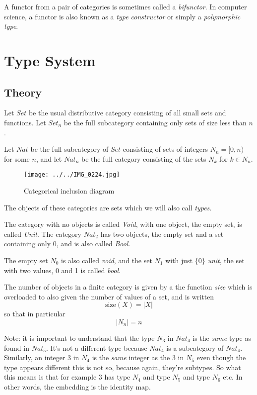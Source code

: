 \documentclass[oneside]{book}
\theoremstyle{plain}
\theoremstyle{definition}
\theoremstyle{plain}
\def\Set{\mathit{Set}}
\def\Nat{\mathit{Nat}}
\begin{document}
A functor from a pair of categories is sometimes called a {\em bifunctor}.
In computer science, a functor is also known as a {\em type constructor}
or simply a {\em polymorphic type}.
\chapter{Type System}
\section{Theory}
Let $\Set$ be the usual distributive category consisting of all small sets and functions.
Let $\Set_n$ be the full subcategory containing only sets of size less than $n$.

Let $\Nat$ be the full subcategory of $\Set$ consisting
of sets of integers $\mathit{N}_n=[0,n)$ for some $n$, and let
$\Nat_n$ be the full category consisting of the 
sets $N_k$ for $k\in \mathit{N}_n$.

\begin{figure}[h]
\texttt{[image: ../../IMG\_0224.jpg]}
\caption{Categorical inclusion diagram}
\label{fig:categorical inclusion}
\end{figure}

The objects of these categories are sets which we will also call {\em types.}

The category with no objects is called {\em Void}, with one object, the empty set,
is called {\em Unit}. The category $\mathit{Nat_2}$ has two objects, the empty set
and a set containing only 0, and is also called {\em Bool}.

The empty set $\mathit{N_0}$ is also called {\em void}, and the set $\mathit{N_1}$
with just $\{0\}$ {\em unit}, the set with two values, 0 and 1 is called {\em bool}.

The number of objects in a finite category is given by a the function {\em size}
which is overloaded to also given the number of values of a set, and is written
\begin{equation}
\mathrm{size}(X) = |X|
\end{equation}
so that in particular
\begin{equation}
|N_n|=n
\end{equation}

Note: it is important to understand that the type $N_3$ in $\Nat_4$ is the {\em same}
type as found in $\Nat_5$. It's not a different type because $\Nat_4$ is a subcategory
of $\Nat_4$. Similarly, an integer $3$ in $N_4$ is the {\em same} integer as the $3$
in $N_5$ even though the type appears different this is not so, because again, they're
subtypes. So what this means is that for example $3$ has type $N_4$ and type $N_5$ and
type $N_6$ etc. In other words, the embedding is the identity map.
\end{document}
